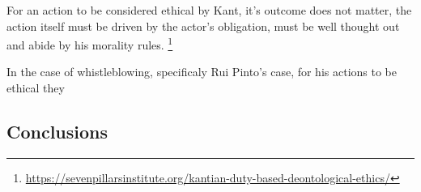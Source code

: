     For an action to be considered ethical by Kant, it's outcome does not matter, the action itself must be driven by the actor's obligation, must be well thought out and abide by his morality rules.
    \footnote{\url{https://sevenpillarsinstitute.org/kantian-duty-based-deontological-ethics/}}

    In the case of whistleblowing, specificaly Rui Pinto's case, for his actions to be ethical they 
    


\subsection{Conclusions}



    